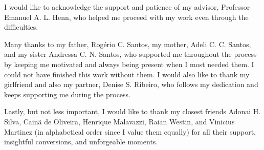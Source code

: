 \begin{agradecimentos}
	I would like to acknowledge the support and patience of my advisor, Professor Emanuel A. L. Henn, who helped me proceed with my work even through the difficulties.

	Many thanks to my father, Rogério C. Santos, my mother, Adeli C. C. Santos, and my sister Andressa C. N. Santos, who supported me throughout the process by keeping me motivated and always being present when I most needed them. I could not have finished this work without them. I would also like to thank my girlfriend and also my partner, Denise S. Ribeiro, who follows my dedication and keeps supporting me during the process.

	Lastly, but not less important, I would like to thank my closest friends Adonai H. Silva, Cainã de Oliveira, Henrique Malavazzi, Raian Westin, and Vinicius Martinez (in alphabetical order since I value them equally) for all their support, insightful conversions, and unforgeable moments.



	
\end{agradecimentos}
